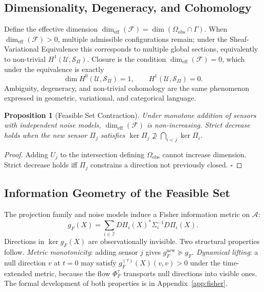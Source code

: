 \documentclass[11pt, oneside]{article}
\newtheorem{proposition}[theorem]{Proposition}
\begin{document}
\subsection{Dimensionality, Degeneracy, and Cohomology}

Define the effective dimension $\dim_{\mathrm{eff}}(\mathcal{F}) = \dim(\Omega_{\mathrm{obs}}
\cap \Gamma)$. When $\dim_{\mathrm{eff}}(\mathcal{F}) > 0$, multiple admissible
configurations remain; under the Sheaf-Variational Equivalence this corresponds to
multiple global sections, equivalently to non-trivial $H^1(\mathcal{U}, \mathcal{S}_\Pi)$.
Closure is the condition $\dim_{\mathrm{eff}}(\mathcal{F}) = 0$, which under the
equivalence is exactly
\[
\dim H^0(\mathcal{U}, \mathcal{S}_\Pi) = 1, \qquad H^1(\mathcal{U}, \mathcal{S}_\Pi) = 0.
\]
Ambiguity, degeneracy, and non-trivial cohomology are the same phenomenon expressed in
geometric, variational, and categorical language.

\begin{proposition}[Feasible Set Contraction]
\label{prop:contraction}
Under monotone addition of sensors with independent noise models, $\dim_{\mathrm{eff}}(\mathcal{F})$
is non-increasing. Strict decrease holds when the new sensor $\Pi_j$ satisfies
$\ker \Pi_j \not\supseteq \bigcap_{i < j} \ker \Pi_i$.
\end{proposition}
\begin{proof}
Adding $U_j$ to the intersection defining $\Omega_{\mathrm{obs}}$ cannot increase
dimension. Strict decrease holds iff $\Pi_j$ constrains a direction not previously closed.
$\square$
\end{proof}

\subsection{Information Geometry of the Feasible Set}

The projection family and noise models induce a Fisher information metric on $\mathcal{A}$:
\[
g_F(X) = \sum_{i \in \mathcal{I}} D\Pi_i(X)^* \Sigma_i^{-1} D\Pi_i(X).
\]
Directions in $\ker g_F(X)$ are observationally invisible. Two structural properties
follow. \emph{Metric monotonicity}: adding sensor $j$ gives
$g_F^{\mathrm{new}} \succeq g_F$. \emph{Dynamical lifting}: a null direction $v$ at
$t = 0$ may satisfy $g_F^{(\tau)}(X)(v,v) > 0$ under the time-extended metric, because
the flow $\Phi_F^\tau$ transports null directions into visible ones. The formal
development of both properties is in Appendix~\ref{app:fisher}.
\end{document}
